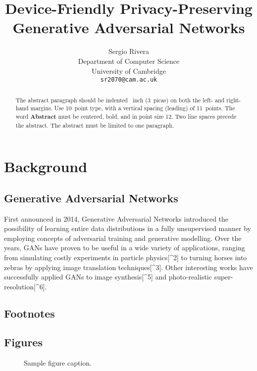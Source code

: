 \documentclass{article}
\title{Device-Friendly Privacy-Preserving Generative Adversarial Networks}
\author{
    Sergio Rivera \\
    Department of Computer Science \\
    University of Cambridge \\
    \texttt{sr2070@cam.ac.uk}
}
\begin{document}
    \maketitle

    \begin{abstract}
        The abstract paragraph should be indented ~inch (3~picas) on
        both the left- and right-hand margins. Use 10~point type, with a vertical
        spacing (leading) of 11~points.  The word \textbf{Abstract} must be centered,
        bold, and in point size 12. Two line spaces precede the abstract. The abstract
        must be limited to one paragraph.
    \end{abstract}

    \section{Background}

    \subsection{Generative Adversarial Networks}

    First announced in 2014, Generative Adversarial Networks\cite{goodfellowGenerativeAdversarialNetworks2014} introduced the possibility of learning entire data
    distributions in a fully unsupervised manner by employing concepts of adversarial training and generative modelling.
    Over the years, GANs have proven to be useful in a wide variety of applications, ranging from simulating costly
    experiments in particle physics[^2] to turning horses into zebras by applying image translation techniques[^3].
    Other interesting works have successfully applied GANs to image synthesis[^5] and photo-realistic
    super-resolution[^6].

    \subsection{Footnotes}

    \subsection{Figures}

    \begin{figure}
        \centering
        \fbox{\rule[-.5cm]{0cm}{4cm} \rule[-.5cm]{4cm}{0cm}}
        \caption{Sample figure caption.}
    \end{figure}
\end{document}
